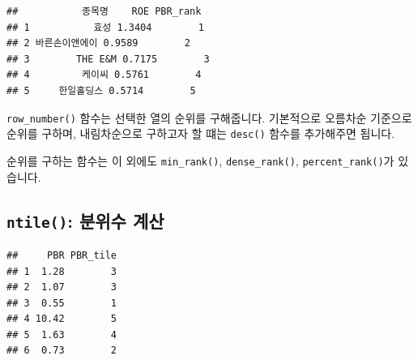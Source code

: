 \documentclass[12pt,]{book}
\newenvironment{Shaded}{\begin{snugshade}}{\end{snugshade}}
\newcommand{\DataTypeTok}[1]{\textcolor[rgb]{0.13,0.29,0.53}{#1}}
\newcommand{\DecValTok}[1]{\textcolor[rgb]{0.00,0.00,0.81}{#1}}
\newcommand{\KeywordTok}[1]{\textcolor[rgb]{0.13,0.29,0.53}{\textbf{#1}}}
\newcommand{\NormalTok}[1]{#1}
\newcommand{\OperatorTok}[1]{\textcolor[rgb]{0.81,0.36,0.00}{\textbf{#1}}}
\newcommand{\StringTok}[1]{\textcolor[rgb]{0.31,0.60,0.02}{#1}}
\begin{document}
\begin{Shaded}
\end{Shaded}

\begin{verbatim}
##           종목명    ROE PBR_rank
## 1           효성 1.3404        1
## 2 바른손이앤에이 0.9589        2
## 3        THE E&M 0.7175        3
## 4         케이씨 0.5761        4
## 5     한일홀딩스 0.5714        5
\end{verbatim}

\texttt{row\_number()} 함수는 선택한 열의 순위를 구해줍니다. 기본적으로 오름차순 기준으로 순위를 구하며, 내림차순으로 구하고자 할 떄는 \texttt{desc()} 함수를 추가해주면 됩니다.

순위를 구하는 함수는 이 외에도 \texttt{min\_rank()}, \texttt{dense\_rank()}, \texttt{percent\_rank()}가 있습니다.

\hypertarget{ntile--}{%
\subsection{\texorpdfstring{\texttt{ntile()}: 분위수 계산}{ntile(): 분위수 계산}}\label{ntile--}}

\begin{Shaded}
\end{Shaded}

\begin{verbatim}
##     PBR PBR_tile
## 1  1.28        3
## 2  1.07        3
## 3  0.55        1
## 4 10.42        5
## 5  1.63        4
## 6  0.73        2
\end{verbatim}
\end{document}
